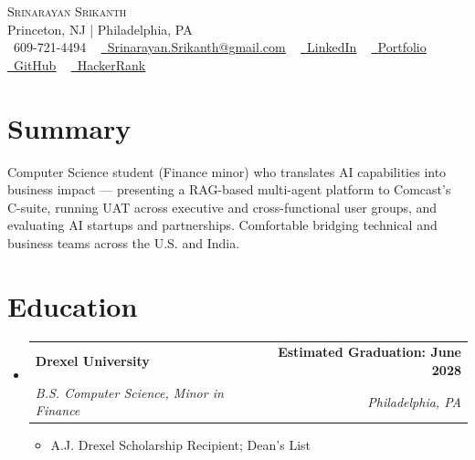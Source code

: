 \documentclass[letterpaper,10.8pt]{article} %
\makeatletter
\newcommand{\resumeItem}[1]{
  \item\small{#1}
}
\newcommand{\resumeSubheading}[4]{
  \vspace{-3pt}\item
    \begin{tabular*}{1.0\textwidth}[t]{l@{\extracolsep{\fill}}r}
      \textbf{#1} & \textbf{\small #2} \\
      \textit{\small#3} & \textit{\small #4} \\
    \end{tabular*}\vspace{-6pt}
}
\newcommand{\resumeSubHeadingListStart}{\begin{itemize}[leftmargin=0.0in, label={}, itemsep=1pt]}
\newcommand{\resumeSubHeadingListEnd}{\end{itemize}}
\newcommand{\resumeItemListStart}{\begin{itemize}[leftmargin=*, itemsep=1pt]}
\newcommand{\resumeItemListEnd}{\end{itemize}\vspace{-4pt}}
\makeatother
\begin{document}
\begin{center}
    {\Huge \scshape Srinarayan Srikanth} \\ \vspace{1pt}
    Princeton, NJ | Philadelphia, PA \\ \vspace{1pt}
    \small \raisebox{-0.1\height}\faPhone\ 609-721-4494 ~ 
    \href{mailto:Srinarayan.Srikanth@gmail.com}{\raisebox{-0.2\height}\faEnvelope\ \underline{Srinarayan.Srikanth@gmail.com}} ~ 
    \href{https://www.linkedin.com/in/srinarayan-srikanth-bb2750259/}{\raisebox{-0.2\height}\faLinkedin\ \underline{LinkedIn}} ~
    \href{https://srisrikanth.com/}{\raisebox{-0.2\height}\faGlobe\ \underline{Portfolio}} ~
    \href{https://github.com/SriSrik123}{\raisebox{-0.2\height}\faGithub\ \underline{GitHub}} ~
    \href{https://www.hackerrank.com/profile/hellosri2006}{\raisebox{-0.2\height}\faCode\ \underline{HackerRank}}
    \vspace{-8pt}
\end{center}


\section{Summary}
Computer Science student (Finance minor) who translates AI capabilities into business impact — presenting a RAG-based multi-agent platform to Comcast's C-suite, running UAT across executive and cross-functional user groups, and evaluating AI startups and partnerships. Comfortable bridging technical and business teams across the U.S. and India.

\section{Education}
  \resumeSubHeadingListStart
    \resumeSubheading
      {Drexel University}{Estimated Graduation: June 2028}
      {B.S. Computer Science, Minor in Finance}{Philadelphia, PA}
      \resumeItemListStart
        \resumeItem{A.J. Drexel Scholarship Recipient; Dean's List}
      \resumeItemListEnd
  \resumeSubHeadingListEnd

\end{document}

